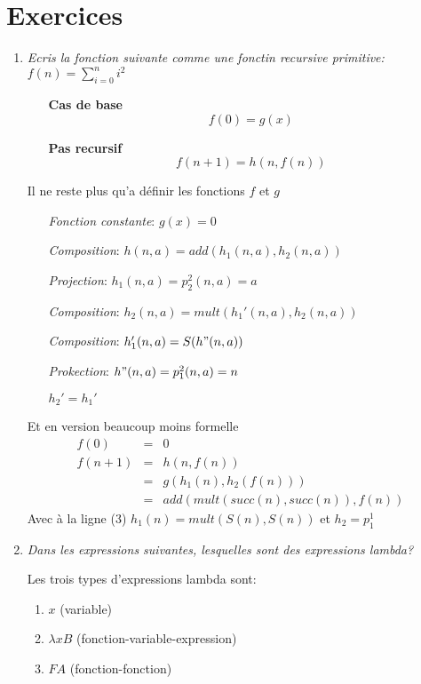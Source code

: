 \documentclass[a4paper,11pt,onecolumn]{article}
\begin{document}
\section{Exercices}
\begin{enumerate}

\item \textit{Ecris la fonction suivante comme une fonctin recursive primitive: $f(n) = \sum_{i=0}^{n}i^2$}

\begin{itemize}
	\item[\textbf{Cas de base}] $$f(0) = g(x)$$
	\item[\textbf{Pas recursif}] $$f(n+1) = h(n,f(n))$$
\end{itemize}

Il ne reste plus qu'a définir les fonctions $f$ et $g$

\begin{itemize}
	\item[] \textit{Fonction constante}: $g(x) = 0$
	\item[] \textit{Composition}: $h(n,a) = add(h_1(n,a),h_2(n,a))$
	\item[] \textit{Projection}: $h_1(n,a) = p_2^2(n,a)=a$
	\item[] \textit{Composition}: $h_2(n,a) = mult(h_1'(n,a), h_2(n,a))$
	\item[] \textit{Composition}: $h_1'(n,a) = S(h"(n,a))$
	\item[] \textit{Prokection}: $h"(n,a)=p_1^2(n,a) = n$
	\item[] $h_2' = h_1'$
\end{itemize}

Et en version beaucoup moins formelle
\begin{eqnarray}
	f(0) &=& 0 \\
	f(n+1) &=& h(n,f(n)) \\
	&=& g(h_1(n), h_2(f(n))) \\
	&=& add(mult(succ(n), succ(n)), f(n))
\end{eqnarray}
Avec à la ligne (3) $h_1(n) = mult(S(n), S(n))$ et $h_2 = p_1^1$

\item \textit{Dans les expressions suivantes, lesquelles sont des expressions lambda?}

Les trois types d'expressions lambda sont:
\begin{enumerate}
	\item $x$ (variable)
	\item $\lambda x B$ (fonction-variable-expression)
	\item $F A$ (fonction-fonction)
\end{enumerate}


\end{enumerate}
\end{document}

